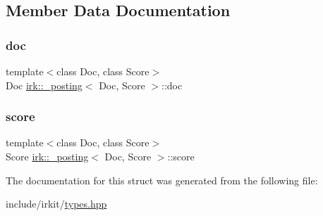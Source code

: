 \subsection{Member Data Documentation}
\mbox{\label{structirk_1_1__posting_a29e93e3e5073ea27ef621e57dc32ff17}} 
\subsubsection{\texorpdfstring{doc}{doc}}
{\footnotesize\ttfamily template$<$class Doc, class Score$>$ \\
Doc \mbox{\hyperlink{structirk_1_1__posting}{irk\+::\+\_\+posting}}$<$ Doc, Score $>$\+::doc}

\mbox{\label{structirk_1_1__posting_ac2f926fe8b05ab8d4d2cd2199910d82f}} 
\subsubsection{\texorpdfstring{score}{score}}
{\footnotesize\ttfamily template$<$class Doc, class Score$>$ \\
Score \mbox{\hyperlink{structirk_1_1__posting}{irk\+::\+\_\+posting}}$<$ Doc, Score $>$\+::score}



The documentation for this struct was generated from the following file\+:\begin{DoxyCompactItemize}
\item 
include/irkit/\mbox{\hyperlink{types_8hpp}{types.\+hpp}}\end{DoxyCompactItemize}
